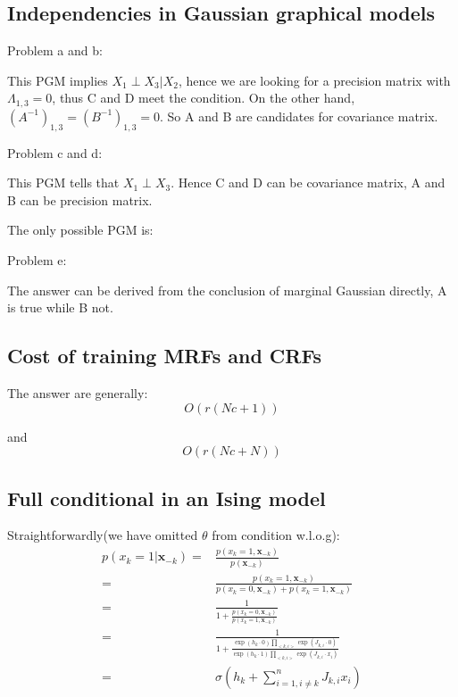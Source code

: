 \documentclass[UTF8]{ctexart}
\begin{document}
\subsection{Independencies in Gaussian graphical models}
Problem a and b:

This PGM implies $X_{1} \perp X_{3}|X_{2}$, hence we are looking for a precision matrix with $\Lambda_{1,3}=0$, thus C and D meet the condition. On the other hand, $(A^{-1})_{1,3}=(B^{-1})_{1,3}=0$. So A and B are candidates for covariance matrix.

Problem c and d:

This PGM tells that $X_{1} \perp X_{3}$. Hence C and D can be covariance matrix, A and B can be precision matrix.

The only possible PGM is:
\begin{figure}[h]
\small
\centering
{}
\end{figure}

Problem e:

The answer can be derived from the conclusion of marginal Gaussian directly, A is true while B not.

\subsection{Cost of training MRFs and CRFs}
The answer are generally:
$$O(r(Nc+1))$$

and
$$O(r(Nc+N))$$

\subsection{Full conditional in an Ising model}
Straightforwardly(we have omitted $\theta$ from condition w.l.o.g):
\begin{align}
p(x_{k}=1|\textbf{x}_{-k})=&\frac{p(x_{k}=1,\textbf{x}_{-k})}{p(\textbf{x}_{-k})} \nonumber \\
=&\frac{p(x_{k}=1,\textbf{x}_{-k})}{p(x_{k}=0,\textbf{x}_{-k})+p(x_{k}=1,\textbf{x}_{-k})} \nonumber \\
=&\frac{1}{1+\frac{p(x_{k}=0,\textbf{x}_{-k})}{p(x_{k}=1,\textbf{x}_{-k})}} \nonumber \\
=&\frac{1}{1+\frac{\exp(h_{k}\cdot 0)\prod_{<k,i>}\exp(J_{k,i}\cdot 0)}{\exp(h_{k}\cdot 1)\prod_{<k,i>}\exp(J_{k,i}\cdot x_{i})}} \nonumber \\
=&\sigma(h_{k}+\sum_{i=1,i\neq k}^{n}J_{k,i}x_{i}) \nonumber
\end{align}
\end{document}
